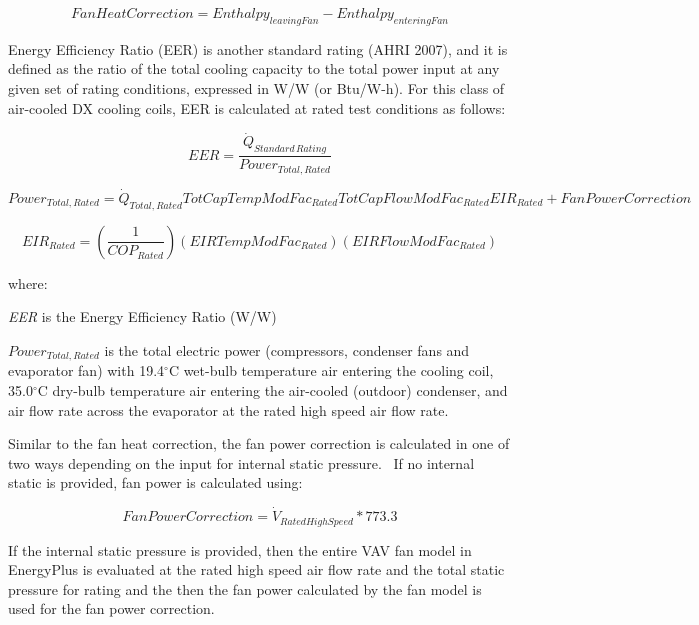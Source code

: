 \begin{equation}
FanHeatCorrection = Enthalp{y_{leavingFan}} - Enthalp{y_{enteringFan}}
\end{equation}

Energy Efficiency Ratio (EER) is another standard rating (AHRI 2007), and it is defined as the ratio of the total cooling capacity to the total power input at any given set of rating conditions, expressed in W/W (or Btu/W-h). For this class of air-cooled DX cooling coils, EER is calculated at rated test conditions as follows:

\begin{equation}
  EER = \frac{{\dot Q}_{Standard\,Rating}}{Power_{Total,Rated}}
\end{equation}

\begin{equation}
    Power_{Total,Rated} = \dot{Q}_{Total,Rated} TotCapTempModFac_{Rated} TotCapFlowModFac_{Rated} EIR_{Rated} + FanPowerCorrection
\end{equation}

\begin{equation}
  EIR_{Rated} = \left( {\frac{1}{{CO{P_{Rated}}}}} \right)(EIRTempModFa{c_{Rated}})(EIRFlowModFa{c_{Rated}})
\end{equation}

where:

\emph{EER} is the Energy Efficiency Ratio (W/W)

\(Power_{Total,Rated}\) is the total electric power (compressors, condenser fans and evaporator fan) with 19.4\(^{\circ}\)C wet-bulb temperature air entering the cooling coil, 35.0\(^{\circ}\)C dry-bulb temperature air entering the air-cooled (outdoor) condenser, and air flow rate across the evaporator at the rated high speed air flow rate.

Similar to the fan heat correction, the fan power correction is calculated in one of two ways depending on the input for internal static pressure.~ If no internal static is provided, fan power is calculated using:

\begin{equation}
  FanPowerCorrection = {\dot V_{RatedHighSpeed}} * 773.3
\end{equation}

If the internal static pressure is provided, then the entire VAV fan model in EnergyPlus is evaluated at the rated high speed air flow rate and the total static pressure for rating and the then the fan power calculated by the fan model is used for the fan power correction.

